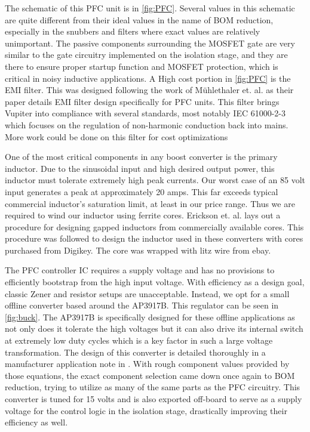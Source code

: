 \documentclass[15pt]{article}
\begin{document}
The schematic of this PFC unit is in \autoref{fig:PFC}. Several values in this schematic are quite different from their ideal values in the name of BOM reduction, especially in the snubbers and filters where exact values are relatively unimportant. The passive components surrounding the MOSFET gate are very similar to the gate circuitry implemented on the isolation stage, and they are there to ensure proper startup function and MOSFET protection, which is critical in noisy inductive applications. A High cost portion in \autoref{fig:PFC} is the EMI filter. This was designed following the work of Mühlethaler et. al.\cite{8} as their paper details EMI filter design specifically for PFC units. This filter brings Vupiter into compliance with several standards, most notably IEC 61000-2-3 \cite{3} which focuses on the regulation of non-harmonic conduction back into mains. More work could be done on this filter for cost optimizations

One of the most critical components in any boost converter is the primary inductor. Due to the sinusoidal input and high desired output power, this inductor must tolerate extremely high peak currents. Our worst case of an 85 volt input generates a peak at approximately 20 amps. This far exceeds typical commercial inductor’s saturation limit, at least in our price range. Thus we are required to wind our inductor using ferrite cores. Erickson et. al.\cite{2} lays out a procedure for designing gapped inductors from commercially available cores. This procedure was followed to design the inductor used in these converters with cores purchased from Digikey. The core was wrapped with litz wire from ebay.

The PFC controller IC requires a supply voltage and has no provisions to efficiently bootstrap from the high input voltage. With efficiency as a design goal, classic Zener and resistor setups are unacceptable. Instead, we opt for a small offline converter based around the AP3917B. This regulator can be seen in \autoref{fig:buck}. The AP3917B is specifically designed for these offline applications as not only does it tolerate the high voltages but it can also drive its internal switch at extremely low duty cycles which is a key factor in such a large voltage transformation. The design of this converter is detailed thoroughly in a manufacturer application note in \cite{7}. With rough component values provided by those equations, the exact component selection came down once again to BOM reduction, trying to utilize as many of the same parts as the PFC circuitry. This converter is tuned for 15 volts and is also exported off-board to serve as a supply voltage for the control logic in the isolation stage, drastically improving their efficiency as well.
\end{document}
